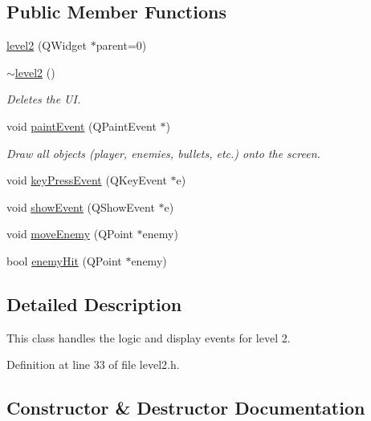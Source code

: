 \subsection*{Public Member Functions}
\begin{DoxyCompactItemize}
\item 
\hyperlink{classlevel2_a60e8d70343c4d2aee2eb4fff186d9052}{level2} (Q\+Widget $\ast$parent=0)
\item 
\hyperlink{classlevel2_a1088443fbe07a629a2f5fb8874dce992}{$\sim$level2} ()\hypertarget{classlevel2_a1088443fbe07a629a2f5fb8874dce992}{}\label{classlevel2_a1088443fbe07a629a2f5fb8874dce992}

\begin{DoxyCompactList}\small\item\em Deletes the UI. \end{DoxyCompactList}\item 
void \hyperlink{classlevel2_ae9d1427d9d57a2c4eee057c55106438a}{paint\+Event} (Q\+Paint\+Event $\ast$)\hypertarget{classlevel2_ae9d1427d9d57a2c4eee057c55106438a}{}\label{classlevel2_ae9d1427d9d57a2c4eee057c55106438a}

\begin{DoxyCompactList}\small\item\em Draw all objects (player, enemies, bullets, etc.) onto the screen. \end{DoxyCompactList}\item 
void \hyperlink{classlevel2_aaf795c710bf3fe689cc1b8a8aafc07a5}{key\+Press\+Event} (Q\+Key\+Event $\ast$e)
\item 
void \hyperlink{classlevel2_abbc04545229e166ac0195f37cabb3908}{show\+Event} (Q\+Show\+Event $\ast$e)
\item 
void \hyperlink{classlevel2_a18024c7ee849253b6c395a8d94c5bdc4}{move\+Enemy} (Q\+Point $\ast$enemy)
\item 
bool \hyperlink{classlevel2_af18eec7d678db9d70448eb9ad1e7292f}{enemy\+Hit} (Q\+Point $\ast$enemy)
\end{DoxyCompactItemize}


\subsection{Detailed Description}
This class handles the logic and display events for level 2. 

Definition at line 33 of file level2.\+h.



\subsection{Constructor \& Destructor Documentation}
